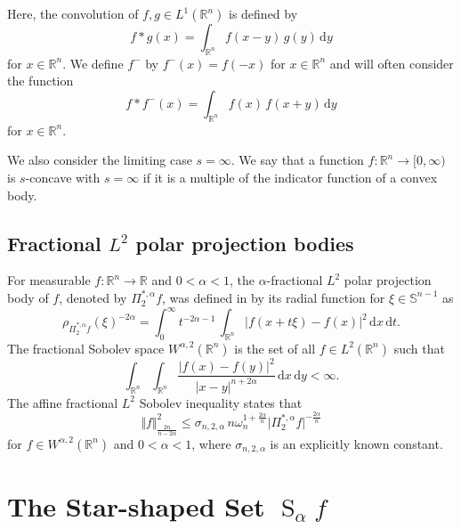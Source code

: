 \documentclass{amsart}
\newcommand{\R}{\mathbb R}
\newcommand{\sn}{{\mathbb S}^{n-1}}
\renewcommand{\d}{\,\mathrm{d}}
\newcommand{\vol}[1]{\vert #1\vert}
\newcommand{\hls}[1]{\operatorname{S}_{#1}\!} %
\begin{document}
\noindent
Here, the convolution of $f,g\in L^1(\R^n)$ is defined by
\[f*g(x)=\int_{\R^n} f(x-y)\,g(y)\d y\]
for $x\in\R^n$. We define $f^-$ by $f^-(x)=f(-x)$ for $x\in\R^n$ and will often consider the function 
\begin{equation}\label{auto}
    f*f^-(x)=\int_{\R^n} f(x)\,f(x+y)\d y
\end{equation}
for $x\in\R^n$.

We also consider the limiting case $s=\infty$. We say that a function $f:\R^n\to[0,\infty)$ is $s$-concave with $s=\infty$ if it is a multiple of the indicator function of a convex body.


\subsection{Fractional $L^2$ polar projection bodies}

For measurable $f:\R^n\to \R$ and $0<\alpha<1$, the $\alpha$-fractional $L^2$ polar projection body of $f$, denoted by $\Pi_2^{\ast, \alpha} f$, was defined in \cite{HaddadLudwig_Lpfracsob} by its radial function 
for $\xi\in\sn$ as
\begin{equation}\label{eq_defpp}
\rho_{\Pi_2^{\ast, \alpha} f}(\xi)^{-2\alpha}= \int_0^\infty t^{-2 \alpha-1}\, \int_{\R^n}\vert f(x +t\xi)-f(x)\vert^2 \d x\d t.
\end{equation}
The fractional Sobolev space $W^{\alpha,2}(\R^n)$ is the set of all $f\in L^2(\R^n)$ such that
\[\int_{\R^n}\int_{\R^n} \frac{\vert f(x)-f(y)\vert^2}{\vert x-y\vert^{n+2\alpha}}\d x\d y<\infty.\]
The affine fractional $L^2$ Sobolev inequality \cite[Theorem 1]{HaddadLudwig_Lpfracsob} states  that
\begin{equation}\label{eq_L2fracsob}
\Vert f\Vert_{{\frac {2n }{n-2\alpha}}}^2
\le
\sigma_{n,2,\alpha}\, n\omega_n^{1+\frac{2\alpha}n} \vol{\Pi_2^{\ast, \alpha} f}^{-\frac {2\alpha}n}
\end{equation}
for $f\in W^{\alpha,2}(\R^n)$ and $0<\alpha<1$, where $\sigma_{n,2,\alpha}$ is an explicitly known constant.


\goodbreak
\section{The Star-shaped Set $\hls \alpha f$}\label{sec_hls_body}
\end{document}
